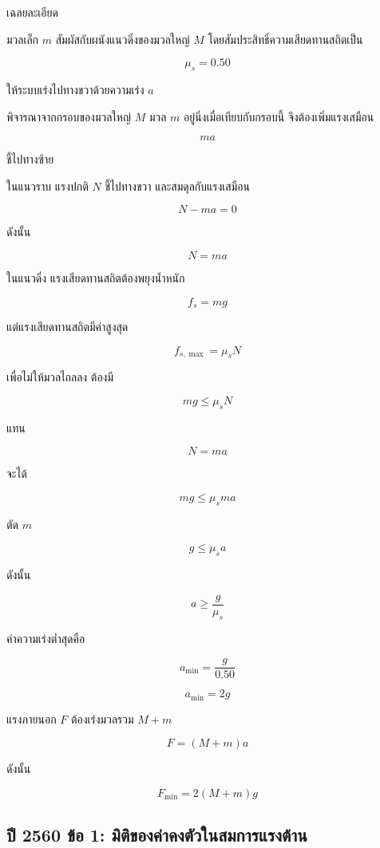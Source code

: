 \begin{examplebox}{เฉลยละเอียด}

มวลเล็ก $m$ สัมผัสกับผนังแนวดิ่งของมวลใหญ่ $M$
โดยสัมประสิทธิ์ความเสียดทานสถิตเป็น

\[
\mu_s=0.50
\]

ให้ระบบเร่งไปทางขวาด้วยความเร่ง $a$

พิจารณาจากกรอบของมวลใหญ่ $M$
มวล $m$ อยู่นิ่งเมื่อเทียบกับกรอบนี้
จึงต้องเพิ่มแรงเสมือน

\[
ma
\]

ชี้ไปทางซ้าย

ในแนวราบ แรงปกติ $N$ ชี้ไปทางขวา
และสมดุลกับแรงเสมือน

\[
N-ma=0
\]

ดังนั้น

\[
N=ma
\]

ในแนวดิ่ง แรงเสียดทานสถิตต้องพยุงน้ำหนัก

\[
f_s=mg
\]

แต่แรงเสียดทานสถิตมีค่าสูงสุด

\[
f_{s,\max}=\mu_sN
\]

เพื่อไม่ให้มวลไถลลง ต้องมี

\[
mg\leq\mu_sN
\]

แทน

\[
N=ma
\]

จะได้

\[
mg\leq\mu_sma
\]

ตัด $m$

\[
g\leq\mu_sa
\]

ดังนั้น

\[
a\geq\frac{g}{\mu_s}
\]

ค่าความเร่งต่ำสุดคือ

\[
a_{\min}
=
\frac{g}{0.50}
\]

\[
a_{\min}=2g
\]

แรงภายนอก $F$ ต้องเร่งมวลรวม $M+m$

\[
F=(M+m)a
\]

ดังนั้น

\[
\boxed{
F_{\min}=2(M+m)g
}
\]
\end{examplebox}

\subsection{ปี 2560 ข้อ 1:
มิติของค่าคงตัวในสมการแรงต้าน}

\vspace{1em}

